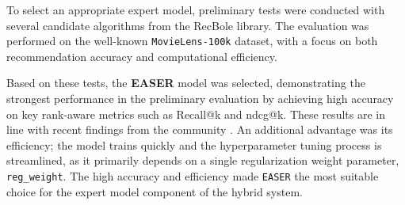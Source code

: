 To select an appropriate expert model, preliminary tests were conducted with several candidate algorithms from the RecBole library. The evaluation was performed on the well-known \texttt{MovieLens-100k} dataset, with a focus on both recommendation accuracy and computational efficiency.

Based on these tests, the \textbf{EASER} model was selected, demonstrating the strongest performance in the preliminary evaluation by achieving high accuracy on key rank-aware metrics such as Recall@k and \acs{ndcg}@k. These results are in line with recent findings from the community \cite{SOTA-TOPN-RECSYS}. An additional advantage was its efficiency; the model trains quickly and the hyperparameter tuning process is streamlined, as it primarily depends on a single regularization weight parameter, \texttt{reg\_weight}. The high accuracy and efficiency made \texttt{EASER} the most suitable choice for the expert model component of the hybrid system.